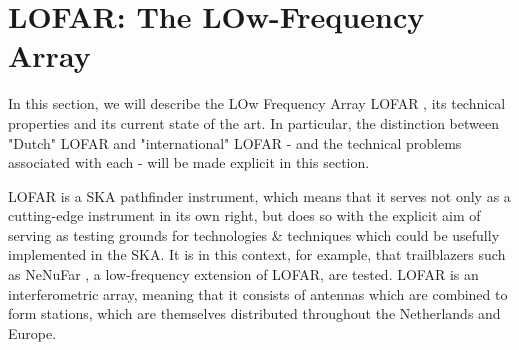 \section{LOFAR: The LOw-Frequency Array}

\pg
In this section, we will describe the LOw Frequency Array LOFAR , its technical properties and its current state of the art. In particular, the distinction between "Dutch" LOFAR and "international" LOFAR - and the technical problems associated with each - will be made explicit in this section.

\pg
LOFAR is a SKA pathfinder instrument, which means that it serves not only as a cutting-edge instrument in its own right, but does so with the explicit aim of serving as testing grounds for technologies \& techniques which could be usefully implemented in the SKA. It is in this context, for example, that trailblazers such as NeNuFar , a low-frequency extension of LOFAR, are tested. LOFAR is an interferometric array, meaning that it consists of antennas which are combined to form stations, which are themselves distributed throughout the Netherlands and Europe.
